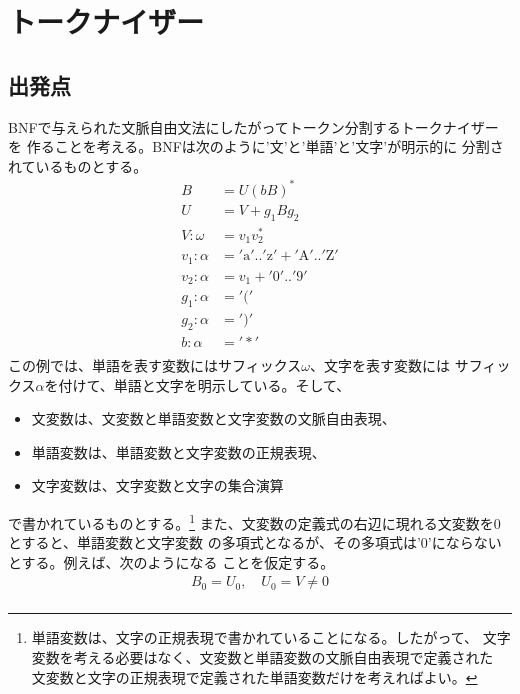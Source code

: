 \begingroup %
	{\setlength\arraycolsep{2pt}
\section{トークナイザー}\label{s1:トークナイザー} %
\subsection{出発点}\label{s2:出発点} %
	BNFで与えられた文脈自由文法にしたがってトークン分割するトークナイザーを
	作ることを考える。BNFは次のように'文'と'単語'と'文字'が明示的に
	分割されているものとする。
	\begin{equation*}\begin{split}
		B &= U (b B)^* \\
		U &= V + g_1 B g_2 \\
		V:\omega &= v_1 v_2^* \\
		v_1:\alpha &= '\text{a}' .. '\text{z}' + '\text{A}' .. '\text{Z}' \\
		v_2:\alpha &= v_1 + '\text{0}' .. '\text{9}' \\
		g_1:\alpha &= '(' \\
		g_2:\alpha &= ')' \\
		b:\alpha &= '*' \\
	\end{split}\end{equation*}
	この例では、単語を表す変数にはサフィックス$\omega$、文字を表す変数には
	サフィックス$\alpha$を付けて、単語と文字を明示している。そして、
	\begin{itemize}\setlength{\itemsep}{-1mm} %
		\item 文変数は、文変数と単語変数と文字変数の文脈自由表現、
		\item 単語変数は、単語変数と文字変数の正規表現、
		\item 文字変数は、文字変数と文字の集合演算
	\end{itemize} %
	で書かれているものとする。\footnote{
		単語変数は、文字の正規表現で書かれていることになる。したがって、
		文字変数を考える必要はなく、文変数と単語変数の文脈自由表現で定義された
		文変数と文字の正規表現で定義された単語変数だけを考えればよい。
	}
	また、文変数の定義式の右辺に現れる文変数を$0$とすると、単語変数と文字変数
	の多項式となるが、その多項式は'0'にならないとする。例えば、次のようになる
	ことを仮定する。
	\begin{equation*}\begin{split}
		B_0 = U_0,\quad U_0 = V \neq 0 \\
	\end{split}\end{equation*}
}
